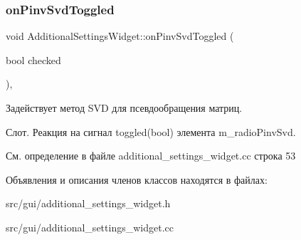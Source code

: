 \subsubsection{\texorpdfstring{on\+Pinv\+Svd\+Toggled}{onPinvSvdToggled}}
{\footnotesize\ttfamily void Additional\+Settings\+Widget\+::on\+Pinv\+Svd\+Toggled (\begin{DoxyParamCaption}\item[{bool}]{checked }\end{DoxyParamCaption})\hspace{0.3cm}{\ttfamily [private]}, {\ttfamily [slot]}}



Задействует метод S\+VD для псевдообращения матриц. 

Слот. Реакция на сигнал toggled(bool) элемента m\+\_\+radio\+Pinv\+Svd. 

См. определение в файле additional\+\_\+settings\+\_\+widget.\+cc строка 53



Объявления и описания членов классов находятся в файлах\+:\begin{DoxyCompactItemize}
\item 
src/gui/additional\+\_\+settings\+\_\+widget.\+h\item 
src/gui/additional\+\_\+settings\+\_\+widget.\+cc\end{DoxyCompactItemize}
